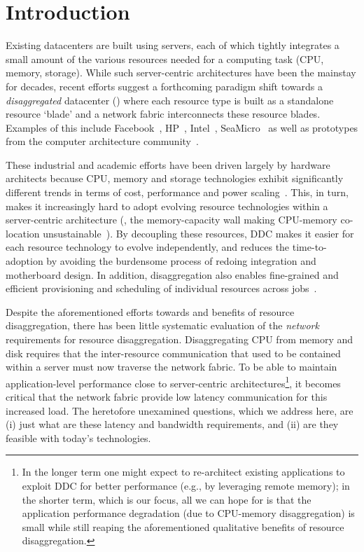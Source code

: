 \section{Introduction}
\label{sec:intro}
Existing datacenters are built using servers, each of which tightly integrates a small amount of the various resources needed for a computing task (CPU, memory, storage). While such server-centric architectures have been the mainstay for decades, recent efforts suggest a forthcoming paradigm shift towards a {\em disaggregated} datacenter (\dis) where each resource type is built as a standalone resource `blade' and a network fabric interconnects these resource blades. Examples of this include Facebook~\cite{fdr}, HP~\cite{hptm}, Intel~\cite{rsa}, SeaMicro~\cite{seamicro} as well as prototypes from the computer architecture community~\cite{firebox, sonuma, ddcHwDesign1}. 

These industrial and academic efforts have been driven largely by hardware architects because CPU, memory and storage technologies exhibit significantly different trends in terms of cost, performance and power scaling~\cite{memristors,nvram,reg-ex-hardware,gpus}. This, in turn, makes it increasingly hard to adopt evolving resource technologies within a server-centric architecture (\eg, the memory-capacity wall making CPU-memory co-location unsustainable~\cite{ddcHwDesign1}). By decoupling these resources, DDC makes it easier for each resource technology to evolve independently, and reduces the time-to-adoption by avoiding the burdensome process of redoing integration and motherboard design. In addition, disaggregation also enables fine-grained and efficient provisioning and scheduling of individual resources across jobs~\cite{hotnets}. 

Despite the aforementioned efforts towards and benefits of resource disaggregation, there has been little systematic evaluation of the \emph{network} requirements for resource disaggregation. Disaggregating CPU from memory and disk requires that the inter-resource communication that used to be contained within a server must now traverse the network fabric. To be able to maintain application-level performance close to server-centric architectures{\footnote{In the longer term one might expect to re-architect existing applications to exploit DDC for better performance (e.g., by leveraging remote memory); in the shorter term, which is our focus, all we can hope for is that the application performance degradation (due to CPU-memory disaggregation) is small while still reaping the aforementioned qualitative benefits of resource disaggregation.}}, it becomes critical that the network fabric provide low latency communication for this increased load. The heretofore unexamined questions, which we address here, are (i) just what are these latency and bandwidth requirements, and (ii) are they feasible with today's technologies.

